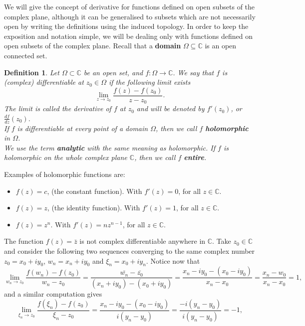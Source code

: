 \documentclass{amsart}
\newtheorem{mydef}{Definition}
\begin{document}
We will give the concept of derivative for functions defined on open subsets of the complex plane, although it can be generalised to subsets which are not necessarily open by writing the definitions using the induced topology. In order to keep the exposition and notation simple, we will be dealing only with functions defined on  open subsets of the complex plane.
Recall that a \textbf{domain} \(\Omega \subseteq \mathbb{C}\) is an open connected set.

\begin{mydef}
Let \(\Omega\subset \mathbb{C}\) be an open set, and  \(f:\Omega \to \mathbb{C}\). We say that \(f\) is (complex) differentiable at \(z_0\in \Omega\) if the following limit exists
\[ \lim_{z\to z_0}\frac{f(z)- f(z_0)}{z - z_0}. \]
The limit is called the derivative of \(f\) at \(z_0\) and will be denoted by \(f'(z_0)\), or \(\frac{df}{dz}(z_0)\).\\
If \(f\) is differentiable at every point of a domain \(\Omega\), then we call \(f\) \textbf{holomorphic} in \(\Omega\).\\
We use the term \textbf{analytic} with the same meaning as holomorphic.
If \(f\) is holomorphic on the whole complex plane \(\mathbb{C}\), then we call \(f\) \textbf{entire}.
\end{mydef}


Examples of holomorphic functions are:
\begin{itemize}
\item \(f(z) = c\), (the constant function). With \(f'(z) = 0\), for all \(z\in \mathbb{C}\).
\item \(f(z) = z\), (the identity function). With \(f'(z) = 1\), for all \(z\in \mathbb{C}\).
\item \(f(z) = z^n\). With \(f'(z) = nz^{n-1}\), for all \(z\in \mathbb{C}\).
\end{itemize}

The function \(f(z) = \bar{z}\) is not complex differentiable anywhere in \(\mathbb{C}\). Take \(z_0\in \mathbb{C}\) and consider the following two sequences converging to the same complex number \(z_0 = x_0 + iy_0\), \(w_n = x_n + iy_0\) and \(\xi_n = x_0 + i y_n\). Notice now that
\[ \lim_{w_n\to z_0} \frac{f(w_n) - f(z_0)}{w_n - z_0} = \frac{\bar{w_n} - \bar{z_0}}{(x_n + iy_0) - (x_0 + iy_0)} = \frac{x_n - iy_0 - (x_0 - iy_0)}{x_n - x_0} = \frac{x_n - w_0}{x_n - x_0} = 1, \]
and a similar computation gives
\[ \lim_{\xi_n\to z_0} \frac{f(\xi_n) - f(z_0)}{\xi_n - z_0} = \frac{x_n - iy_0 - (x_0 - iy_0)}{i(y_n - y_0)} = \frac{- i(y_n - y_0)}{i(y_n - y_0)} = -1, \]
\end{document}

